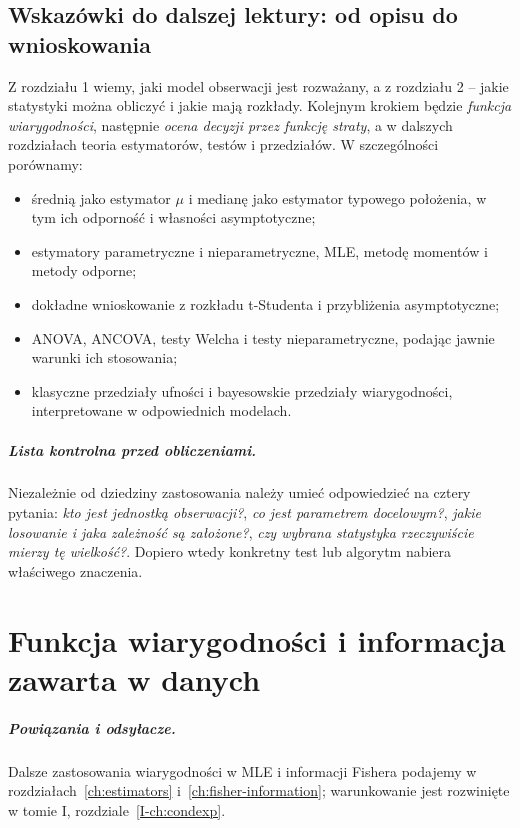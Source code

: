 \documentclass[11pt,a4paper,oneside]{report}
\numberwithin{equation}{chapter}
\theoremstyle{plain}
\theoremstyle{definition}
\theoremstyle{remark}
\begin{document}
\section{Wskazówki do dalszej lektury: od opisu do wnioskowania}
Z rozdziału 1 wiemy, jaki model obserwacji jest rozważany, a z rozdziału 2 -- jakie statystyki można obliczyć i jakie mają rozkłady. Kolejnym krokiem będzie \emph{funkcja wiarygodności}, następnie \emph{ocena decyzji przez funkcję straty}, a w dalszych rozdziałach teoria estymatorów, testów i przedziałów. W szczególności porównamy:
\begin{itemize}
\item średnią jako estymator $\mu$ i medianę jako estymator typowego położenia, w tym ich odporność i własności asymptotyczne;
\item estymatory parametryczne i nieparametryczne, MLE, metodę momentów i metody odporne;
\item dokładne wnioskowanie z rozkładu t-Studenta i przybliżenia asymptotyczne;
\item ANOVA, ANCOVA, testy Welcha i testy nieparametryczne, podając jawnie warunki ich stosowania;
\item klasyczne przedziały ufności i bayesowskie przedziały wiarygodności, interpretowane w odpowiednich modelach.
\end{itemize}

\paragraph{Lista kontrolna przed obliczeniami.}
Niezależnie od dziedziny zastosowania należy umieć odpowiedzieć na cztery pytania: \emph{kto jest jednostką obserwacji?}, \emph{co jest parametrem docelowym?}, \emph{jakie losowanie i jaka zależność są założone?}, \emph{czy wybrana statystyka rzeczywiście mierzy tę wielkość?}. Dopiero wtedy konkretny test lub algorytm nabiera właściwego znaczenia.

\chapter{Funkcja wiarygodności i informacja zawarta w danych}
\label{ch:likelihood}
\paragraph{Powiązania i odsyłacze.} Dalsze zastosowania wiarygodności w MLE i informacji Fishera podajemy w rozdziałach~\ref{ch:estimators} i~\ref{ch:fisher-information}; warunkowanie jest rozwinięte w tomie I, rozdziale~\ref{I-ch:condexp}.
\end{document}
